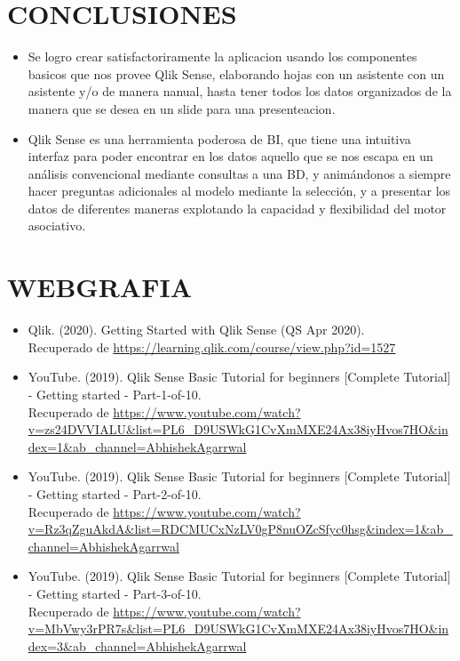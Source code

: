 \documentclass[12pt,letterpaper]{article}
\begin{document}
    \section{CONCLUSIONES}
    \begin{itemize}
        \item Se logro crear satisfactoriramente la aplicacion usando los componentes basicos que nos provee Qlik Sense, elaborando hojas con un asistente con un asistente y/o de manera nanual, hasta tener todos los datos organizados de la manera que se desea en un slide para una presenteacion.
        \item Qlik Sense es una herramienta poderosa de BI, que tiene una intuitiva interfaz para poder encontrar en los datos aquello que se nos escapa en un análisis convencional mediante consultas a una BD, y animándonos a siempre hacer preguntas adicionales al modelo mediante la selección, y a presentar los datos de diferentes maneras explotando la capacidad y flexibilidad del motor asociativo.
    \end{itemize}
    \newpage
    \section{WEBGRAFIA}
    \begin{itemize}
        \item Qlik. (2020). Getting Started with Qlik Sense (QS Apr 2020).\\
        Recuperado de \textcolor{azul}{\url{https://learning.qlik.com/course/view.php?id=1527}}
        \item YouTube. (2019). Qlik Sense Basic Tutorial for beginners [Complete Tutorial] - Getting started - Part-1-of-10.\\
        Recuperado de \textcolor{azul}{\url{https://www.youtube.com/watch?v=zs24DVVIALU&list=PL6_D9USWkG1CvXmMXE24Ax38iyHvos7HO&index=1&ab_channel=AbhishekAgarrwal}}
        \item YouTube. (2019). Qlik Sense Basic Tutorial for beginners [Complete Tutorial] - Getting started - Part-2-of-10.\\
        Recuperado de \textcolor{azul}{\url{https://www.youtube.com/watch?v=Rz3qZguAkdA&list=RDCMUCxNzLV0gP8nuOZcSfyc0hsg&index=1&ab_channel=AbhishekAgarrwal}}
        \item YouTube. (2019). Qlik Sense Basic Tutorial for beginners [Complete Tutorial] - Getting started - Part-3-of-10.\\
        Recuperado de \textcolor{azul}{\url{https://www.youtube.com/watch?v=MbVwy3rPR7s&list=PL6_D9USWkG1CvXmMXE24Ax38iyHvos7HO&index=3&ab_channel=AbhishekAgarrwal}}
    \end{itemize}
\end{document}
